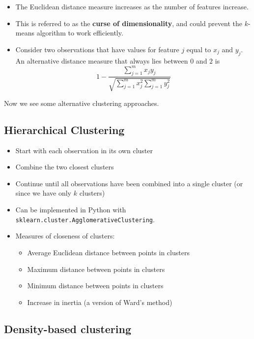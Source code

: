 \begin{itemize}
    \item The Euclidean distance measure increases as the number of features increase.
    \item This is referred to as the \textbf{curse of dimensionality}, and could prevent the $k$-means algorithm to work efficiently.
    \item Consider two observations that have values for feature $j$ equal to $x_{j}$ and $y_{j}$. An alternative distance measure that always lies between $0$ and $2$ is
          \begin{equation*}
              1-\frac{\sum _{j=1}^{m} x_{j} y_{j}}{\sqrt{\sum _{j=1}^{m} x_{j}^{2}\sum _{j=1}^{m} y_{j}^{2}}}
          \end{equation*}
\end{itemize}

Now we see some alternative clustering approaches.

\subsection{Hierarchical Clustering}

\begin{itemize}
    \item Start with each observation in its own cluster
    \item Combine the two closest clusters
    \item Continue until all observations have been combined into a single cluster (or since we have only $k$ clusters)
    \item Can be implemented in Python with \texttt{sklearn.cluster.AgglomerativeClustering}.
    \item Measures of closeness of clusters:
          \begin{itemize}
              \item Average Euclidean distance between points in clusters
              \item Maximum distance between points in clusters
              \item Minimum distance between points in clusters
              \item Increase in inertia (a version of Ward's method)
          \end{itemize}
\end{itemize}

\subsection{Density-based clustering}

